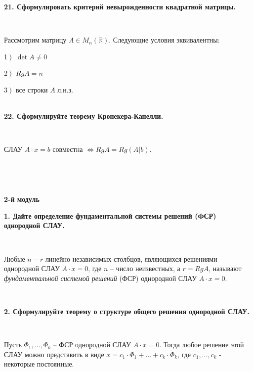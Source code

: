 \documentclass{article}
\begin{document}
    \textbf{21. Сформулировать критерий невырожденности квадратной матрицы.}

    {
        $\;$
        \setlength{\parindent}{0.4cm}
        \hangindent=0.4cm

    Рассмотрим матрицу $A\in M_n(\mathbb{R})$. Следующие условия эквивалентны:

    1$\left.\right)$ $\det A\ne 0$

        2$\left.\right)$ $RgA=n$

        3$\left.\right)$ все строки $A$ л.н.з.\\

        $\;$
        \setlength{\parindent}{0cm}
        \hangindent=0cm
    }

    \textbf{22. Сформулируйте теорему Кронекера-Капелли.}

    {
        $\;$
        \setlength{\parindent}{0.4cm}
        \hangindent=0.4cm

    СЛАУ $A\cdot x=b$ совместна $\Leftrightarrow RgA=Rg(A|b)$.

        $\;$
        \setlength{\parindent}{0cm}
        \hangindent=0cm
    }

    \Large
    \centering
    \newpage

    $\;$

    \textbf{2-й модуль}

    \flushleft
    \small


    \textbf{1. Дайте определение фундаментальной системы решений (ФСР) однородной СЛАУ.}

    {
        $\;$
        \setlength{\parindent}{0.4cm}
        \hangindent=0.4cm

    Любые $n-r$ линейно независимых столбцов, являющихся решениями однородной СЛАУ $A\cdot x=0$, где $n$ -- число неизвестных, а $r=RgA$, называют \textit{фундаментальной системой решений} (ФСР) однородной СЛАУ $A\cdot x=0$.

        $\;$
        \setlength{\parindent}{0cm}
        \hangindent=0cm
    }

    \textbf{2. Сформулируйте теорему о структуре общего решения однородной СЛАУ.}

    {
        $\;$
        \setlength{\parindent}{0.4cm}
        \hangindent=0.4cm

    Пусть $\Phi_1, \ldots, \Phi_k$ -- ФСР однородной СЛАУ $A\cdot x=0$. Тогда любое решение этой СЛАУ можно представить в виде
        $x=c_1\cdot\Phi_1+\ldots+c_k\cdot\Phi_k$, где $c_1,\ldots, c_k$ - некоторые постоянные.

        $\;$
        \setlength{\parindent}{0cm}
        \hangindent=0cm
    }
\end{document}
